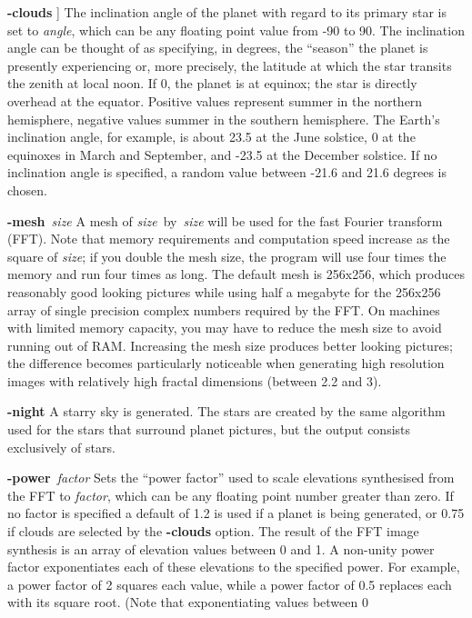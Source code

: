 \begin{TPlist}{{\bf -clouds}}
{}]
The inclination angle of the planet with regard to its primary star is
set to
{\it angle}{\rm ,}
which can be any floating point value from -90 to 90.  The inclination
angle can be thought of as specifying, in degrees, the ``season'' the
planet is presently experiencing or, more precisely, the latitude at
which the star transits the zenith at local noon.  If 0, the planet
is at equinox; the star is directly overhead at the equator.
Positive values represent summer in the northern hemisphere, negative
values summer in the southern hemisphere.  The Earth's inclination
angle, for example, is about 23.5 at the June solstice, 0 at the
equinoxes in March and September, and -23.5 at the December solstice.
If no inclination angle is specified, a random value between -21.6 and
21.6 degrees is chosen.
\item[{{\bf -mesh}{\it \ size}
}]
A mesh of
{\it size}{\rm \ by\ }{\it size}
will be used for the fast Fourier transform (FFT).  Note that memory
requirements and computation speed increase as the square of
{\it size}{\rm ;}
if you double the mesh size, the program will use four times the
memory and run four times as long.  The default mesh is 256x256, which
produces reasonably good looking pictures while using half a megabyte
for the 256x256 array of single precision complex numbers
required by the FFT.  On machines with limited memory capacity, you
may have to reduce the mesh size to avoid running out of RAM.
Increasing the mesh size produces better looking pictures; the
difference becomes particularly noticeable when generating high
resolution images with relatively high fractal dimensions (between 2.2
and 3).
\item[{{\bf -night}}]
A starry sky is generated.  The stars are created by the same algorithm
used for the stars that surround planet pictures, but the output
consists exclusively of stars.
\item[{{\bf -power}{\it \ factor}
}]
Sets the ``power factor'' used to scale elevations synthesised from
the FFT to
{\it factor}{\rm ,}
which can be any floating point number greater than zero.  If no
factor is specified a default of 1.2 is used if a planet is being
generated, or 0.75 if clouds are selected by the
{\bf -clouds}
option.  The result of the FFT image synthesis is an array of elevation
values between 0 and 1.  A non-unity power factor exponentiates each
of these elevations to the specified power.  For example, a power
factor of 2 squares each value, while a power factor of 0.5 replaces
each with its square root.  (Note that exponentiating values between 0

\end{TPlist}
